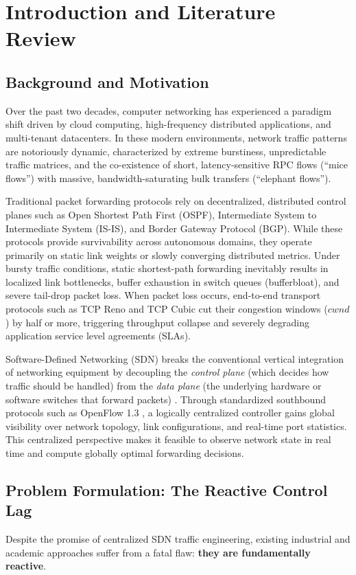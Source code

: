 \chapter{Introduction and Literature Review}
\label{ch:intro_lit}

\section{Background and Motivation}
Over the past two decades, computer networking has experienced a paradigm shift driven by cloud computing, high-frequency distributed applications, and multi-tenant datacenters. In these modern environments, network traffic patterns are notoriously dynamic, characterized by extreme burstiness, unpredictable traffic matrices, and the co-existence of short, latency-sensitive RPC flows (``mice flows'') with massive, bandwidth-saturating bulk transfers (``elephant flows'').

Traditional packet forwarding protocols rely on decentralized, distributed control planes such as Open Shortest Path First (OSPF), Intermediate System to Intermediate System (IS-IS), and Border Gateway Protocol (BGP). While these protocols provide survivability across autonomous domains, they operate primarily on static link weights or slowly converging distributed metrics. Under bursty traffic conditions, static shortest-path forwarding inevitably results in localized link bottlenecks, buffer exhaustion in switch queues (bufferbloat), and severe tail-drop packet loss. When packet loss occurs, end-to-end transport protocols such as TCP Reno and TCP Cubic cut their congestion windows ($cwnd$) by half or more, triggering throughput collapse and severely degrading application service level agreements (SLAs).

Software-Defined Networking (SDN) breaks the conventional vertical integration of networking equipment by decoupling the \textit{control plane} (which decides how traffic should be handled) from the \textit{data plane} (the underlying hardware or software switches that forward packets) \cite{mckeown2008openflow, kreutz2015software}. Through standardized southbound protocols such as OpenFlow 1.3 \cite{openflow13spec}, a logically centralized controller gains global visibility over network topology, link configurations, and real-time port statistics. This centralized perspective makes it feasible to observe network state in real time and compute globally optimal forwarding decisions.

\section{Problem Formulation: The Reactive Control Lag}
Despite the promise of centralized SDN traffic engineering, existing industrial and academic approaches suffer from a fatal flaw: \textbf{they are fundamentally reactive}.

